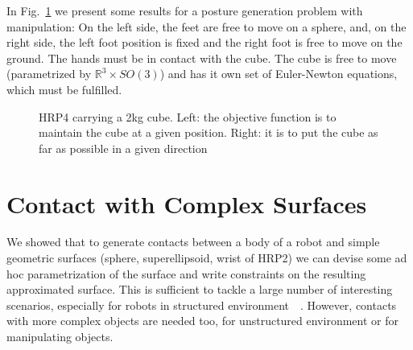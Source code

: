 In Fig.~\ref{fig:hrp4_cube} we present some results for a posture generation problem with manipulation: On the left side, the feet are free to move on a sphere, and, on the right side, the left foot position is fixed and the right foot is free to move on the ground.
The hands must be in contact with the cube.
The cube is free to move (parametrized by $\mathbb{R}^3 \times SO(3)$) and has it own set of Euler-Newton equations, which must be fulfilled.

\begin{figure}
\centering
  \centering
  \setlength\fboxsep{0pt}
  \setlength\fboxrule{1pt}
\caption{HRP4 carrying a 2kg cube.
Left: the objective function is to maintain the cube at a given position.
Right: it is to put the cube as far as possible in a given direction}
\label{fig:hrp4_cube}
\end{figure}

\section{Contact with Complex Surfaces}
\label{sec:contact_with_complex_surfaces}

We showed that to generate contacts between a body of a robot and simple geometric surfaces (sphere, superellipsoid, wrist of HRP2) we can devise some ad hoc parametrization of the surface and write constraints on the resulting approximated surface.
This is sufficient to tackle a large number of interesting scenarios, especially for robots in structured environment~\cite{vaillant:humanoids:2014}~\cite{vaillant:autonomousrobots:2016}.
However, contacts with more complex objects are needed too, for unstructured environment or for manipulating objects.

